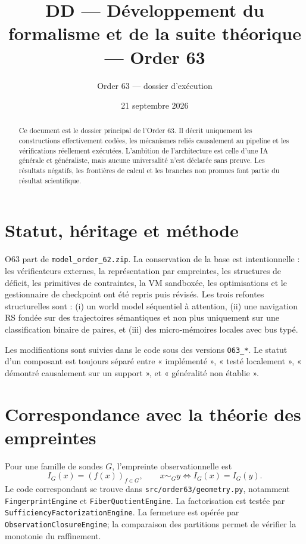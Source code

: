 \documentclass[11pt,a4paper]{article}
\newcommand{\code}[1]{\texttt{#1}}
\begin{document}
\title{DD — Développement du formalisme et de la suite théorique — Order 63}\author{Order 63 — dossier d’exécution}\date{21 septembre 2026}\maketitle

\begin{abstract}
Ce document est le dossier principal de l’Order 63. Il décrit uniquement les constructions effectivement codées, les mécanismes reliés causalement au pipeline et les vérifications réellement exécutées. L’ambition de l’architecture est celle d’une IA générale et généraliste, mais aucune universalité n’est déclarée sans preuve. Les résultats négatifs, les frontières de calcul et les branches non promues font partie du résultat scientifique.
\end{abstract}

\section{Statut, héritage et méthode}
O63 part de \code{model\_order\_62.zip}. La conservation de la base est intentionnelle : les vérificateurs externes, la représentation par empreintes, les structures de déficit, les primitives de contraintes, la VM sandboxée, les optimisations et le gestionnaire de checkpoint ont été repris puis révisés. Les trois refontes structurelles sont : (i) un world model séquentiel à attention, (ii) une navigation RS fondée sur des trajectoires sémantiques et non plus uniquement sur une classification binaire de paires, et (iii) des micro-mémoires locales avec bus typé.

Les modifications sont suivies dans le code sous des versions \code{O63\_*}. Le statut d’un composant est toujours séparé entre « implémenté », « testé localement », « démontré causalement sur un support », et « généralité non établie ».

\section{Correspondance avec la théorie des empreintes}
Pour une famille de sondes $G$, l’empreinte observationnelle est
\[
I_G(x)=(f(x))_{f\in G},
\qquad x\sim_G y \Longleftrightarrow I_G(x)=I_G(y).
\]
Le code correspondant se trouve dans \code{src/order63/geometry.py}, notamment \code{FingerprintEngine} et \code{FiberQuotientEngine}. La factorisation est testée par \code{SufficiencyFactorizationEngine}. La fermeture est opérée par \code{ObservationClosureEngine}; la comparaison des partitions permet de vérifier la monotonie du raffinement.
\end{document}
